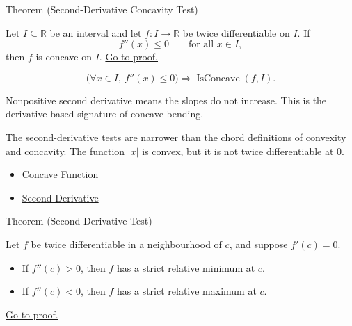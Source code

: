 \begin{theorembox}{Theorem (Second-Derivative Concavity Test)}
\begin{theorem}
\label{thm:second-derivative-concavity-test}
Let $I\subseteq\mathbb{R}$ be an interval and let $f:I\to\mathbb{R}$ be twice differentiable on $I$. If
\[
  f''(x)\leq 0 \qquad \text{for all } x\in I,
\]
then $f$ is concave on $I$.
\hyperref[prf:second-derivative-concavity-test]{Go to proof.}
\end{theorem}
\end{theorembox}

\begin{remark*}
\[
  \bigl(\forall x\in I,\ f''(x)\leq 0\bigr)
  \Longrightarrow
  \operatorname{IsConcave}(f,I).
\]
\end{remark*}

\begin{remark*}[Interpretation]
Nonpositive second derivative means the slopes do not increase. This is the derivative-based signature of concave bending.


The second-derivative tests are narrower than the chord definitions of convexity and concavity. The function $|x|$ is convex, but it is not twice differentiable at $0$.
\end{remark*}

\begin{dependencies}
\begin{itemize}
  \item \hyperref[def:concave-function]{Concave Function}
  \item \hyperref[def:second-derivative]{Second Derivative}
\end{itemize}
\end{dependencies}



\begin{theorembox}{Theorem (Second Derivative Test)}
\begin{theorem}
\label{thm:second-derivative-test}
Let $f$ be twice differentiable in a neighbourhood of $c$, and suppose $f'(c)=0$.
\begin{itemize}
  \item If $f''(c)>0$, then $f$ has a strict relative minimum at $c$.
  \item If $f''(c)<0$, then $f$ has a strict relative maximum at $c$.
\end{itemize}
\hyperref[prf:second-derivative-test]{Go to proof.}
\end{theorem}
\end{theorembox}

